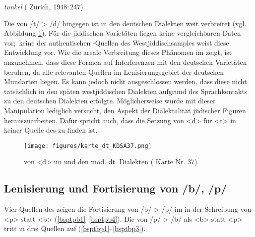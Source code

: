 {{ 
 \item \textit{tunkel}  ( Zürich, 1948:\,247) \label{bsptdak}
 } 
 
 Die  von /t/ > /d/ hingegen ist in den deutschen Dialekten weit verbreitet (vgl.\, Abbildung \ref{kartedtkdsa}). Für die jiddischen Varietäten liegen keine vergleichbaren Daten vor;\, keine der authentischen -Quellen des Westjiddischsamples weist  diese Entwicklung vor. Wie die areale Verbreitung dieses Phänomen im  zeigt, ist anzunehmen, dass diese Formen auf Interferenzen mit den deutschen Varietäten beruhen, da alle relevanten Quellen im Lenisierungsgebiet der deutschen Mundarten liegen. Es kann jedoch nicht ausgeschlossen werden, dass diese  nicht tatsächlich in den späten westjiddischen Dialekten aufgrund des Sprachkontakts zu den deutschen Dialekten erfolgte. Möglicherweise wurde mit dieser Manipulation lediglich versucht, den Aspekt der Dialektalität jüdischer Figuren herauszuarbeiten. Dafür spricht auch, dass die Setzung von <d> für <t> in keiner Quelle des  zu finden ist. %
 
 
  \begin{figure}
		\centering
\texttt{[image: figures/karte\_dt\_KDSA37.png]}
		\caption{\label{kartedtkdsa}  von <d> im  und den mod. dt. Dialekten ( Karte Nr. 37)}
		\end{figure}





  
  \subsection{Lenisierung und Fortisierung von /b/, /p/}\label{pb}

Vier Quellen des  zeigen die Fortisierung von /b/ > /p/ im  in der Schreibung von <p> statt <b> (\ref{bsptpb1}–\ref{bsptpb4}). Die  von /p/ > /b/ als <b> statt <p> tritt in drei Quellen auf (\ref{bsptbp1}–\ref{bsptbp3}).
 
  }
